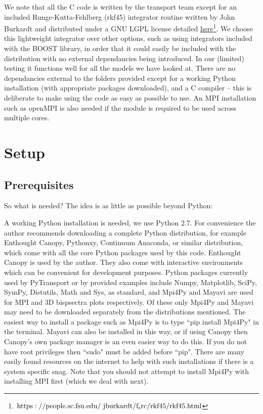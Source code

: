 \documentclass[10pt,
amsmath,amssymb,
aps,prd,nofootinbib,eqsecnum,a4paper]{revtex4}
\newcommand{\CC}{C\nolinebreak\hspace{-.05em}\raisebox{.4ex}{\tiny\bf +}\nolinebreak\hspace{-.10em}\raisebox{.4ex}{\tiny\bf +}}
\def\CC{{C\nolinebreak[4]\hspace{-.05em}\raisebox{.4ex}{\tiny\bf ++}}}
\def\S{ }
\begin{document}
We note that all the \CC \S  code is written by the transport team except for an included Runge-Kutta-Fehlberg (rkf45)
integrator routine written by John Burkardt and distributed under a GNU LGPL license detailed \href{https://people.sc.fsu.edu/~jburkardt/f_src/rkf45/rkf45.html}{here}\footnote{$\rm https://people.sc.fsu.edu/~jburkardt/f_src/rkf45/rkf45.html$}.  We choose this lightweight integrator over other options, such as using integrators included with 
the BOOST library, in order that it could easily be included with the distribution with no external dependancies being introduced. 
In our (limited) testing it functions well for all the models we have looked at.
There are no dependancies external to the folders provided except for a working Python 
installation (with appropriate packages downloaded), and a \CC \S compiler -- this is deliberate to make 
using the code as easy as possible to use.
An MPI installation such as openMPI is also needed if the module is required to be 
used across multiple cores. 

\section{Setup}
\label{Setup}

\subsection {Prerequisites} 

\noindent  So what is needed? The idea is as little as possible beyond Python:

\vspace{0.2cm}
  A working Python installation is needed, we use Python 2.7. 
For convenience the author recommends downloading a complete Python distribution, for  
  example Enthought Canopy, Pythonxy, Continuum Anaconda, or similar distribution, which come with all 
  the core Python packages used by this code. Enthought Canopy is used by the author. 
  They also come with interactive environments which can be convenient for development purposes.
  Python packages currently used by PyTransport or by provided examples include Numpy, Matplotlib, SciPy, SymPy, Distutils, Math and Sys, 
  as standard, and Mpi4Py and Mayavi are used 
  for MPI and 3D bispsectra plots respectively. Of these only Mpi4Py and Mayavi may 
  need to be downloaded separately from the distributions mentioned. The easiest way to install a package 
  such as Mpi4Py is to type 
 ``pip install Mpi4Py" in the terminal. Mayavi can also be installed in this way, or if using Canopy 
 then Canopy's own package manager is an even easier way to do this. If you do not have root 
 privileges then ``sudo" must be added before ``pip". There are many 
 easily found resources on the internet to help with such installations if there is a system 
 specific snag. Note that you should not attempt to install Mpi4Py with installing MPI first (which we deal with next).
\end{document}

